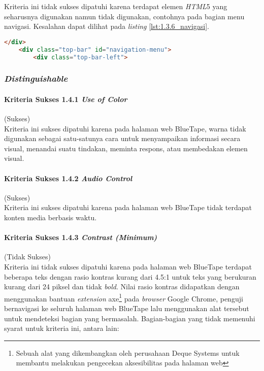 Kriteria ini tidak sukses dipatuhi karena terdapat elemen \textit{HTML}5 yang seharusnya digunakan namun tidak digunakan, contohnya pada bagian menu navigasi. Kesalahan dapat dilihat pada \textit{listing} \ref{lst:1.3.6_navigasi}.

\begin{lstlisting}[frame=single, label={lst:1.3.6_navigasi}, language=HTML, caption=Pelanggaran Kriteria Sukses 1.3.6 pada Menu Navigasi]
    </div>
    <div class="top-bar" id="navigation-menu">
        <div class="top-bar-left">
\end{lstlisting}

\subsubsection{\textit{Distinguishable}}
\label{subsubsec:kepatuhan_bluetape_distinguishable}

\paragraph{Kriteria Sukses 1.4.1 \textit{Use of Color}}
\label{par:kepatuhan_bluetape_kriteria_sukses_1.4.1}
(Sukses)\\

Kriteria ini sukses dipatuhi karena pada halaman web BlueTape, warna tidak digunakan sebagai satu-satunya cara untuk menyampaikan informasi secara visual, menandai suatu tindakan, meminta respons, atau membedakan elemen visual.

\paragraph{Kriteria Sukses 1.4.2 \textit{Audio Control}}
\label{par:kepatuhan_bluetape_kriteria_sukses_1.4.2}
(Sukses)\\

Kriteria ini sukses dipatuhi karena pada halaman web BlueTape tidak terdapat konten media berbasis waktu.

\paragraph{Kriteria Sukses 1.4.3 \textit{Contrast (Minimum)}}
\label{par:kepatuhan_bluetape_kriteria_sukses_1.4.3}
(Tidak Sukses)\\

Kriteria ini tidak sukses dipatuhi karena pada halaman web BlueTape terdapat beberapa teks dengan rasio kontras kurang dari 4.5:1 untuk teks yang berukuran kurang dari 24 piksel dan tidak \textit{bold}. Nilai rasio kontras didapatkan dengan menggunakan bantuan \textit{extension} axe\footnote{Sebuah alat yang dikembangkan oleh perusahaan Deque Systems untuk membantu melakukan pengecekan aksesibilitas pada halaman web} pada \textit{browser} Google Chrome, penguji bernavigasi ke seluruh halaman web BlueTape lalu menggunakan alat tersebut untuk mendeteksi bagian yang bermasalah. Bagian-bagian yang tidak memenuhi syarat untuk kriteria ini, antara lain:

